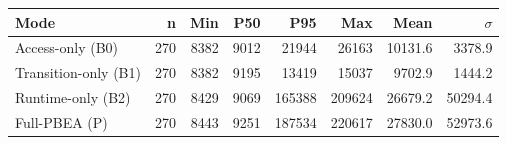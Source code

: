 \begin{tabular}{lrrrrrrr}
\toprule
Mode & n & Min & P50 & P95 & Max & Mean & $\sigma$ \\
\midrule
Access-only (B0) & 270 & 8382 & 9012 & 21944 & 26163 & 10131.6 & 3378.9 \\
Transition-only (B1) & 270 & 8382 & 9195 & 13419 & 15037 & 9702.9 & 1444.2 \\
Runtime-only (B2) & 270 & 8429 & 9069 & 165388 & 209624 & 26679.2 & 50294.4 \\
Full-PBEA (P) & 270 & 8443 & 9251 & 187534 & 220617 & 27830.0 & 52973.6 \\
\bottomrule
\end{tabular}
